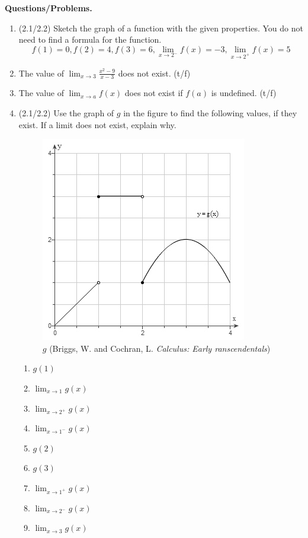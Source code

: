 \documentclass[11pt,letterpaper]{article}
\begin{document}
\vspace{1pc}
\item \textbf{Questions/Problems.} 

\begin{enumerate}
\item (2.1/2.2) Sketch the graph of a function with the given properties.  You do not need to find a formula for the function.
\[f(1)=0,f(2)=4,f(3)=6,\lim_{x\to 2^-}f(x)=-3,\lim_{x\to 2^+}f(x)=5\]

\item The value of $\lim_{x\to 3}\frac{x^2-9}{x-3}$ does not exist. (t/f)

\item The value of $\lim_{x\to a}f(x)$ does not exist if $f(a)$ is undefined. (t/f)

\item (2.1/2.2) Use the graph of $g$ in the figure to find the following values, if they exist.  If a limit does not exist, explain why.

\vspace{-1pc}  
\begin{figure}[h]
\begin{center}
\includegraphics[scale=0.6]{Exam1pic.png}
\caption{$g$ (Briggs, W. and Cochran, L. \emph{Calculus: Early ranscendentals})}
\end{center}
\end{figure}

\begin{enumerate}
\item $g(1)$
\item $\lim_{x\to 1}g(x)$
\item $\lim_{x\to 2^+}g(x)$
\item $\lim_{x\to 1^-}g(x)$
\item $g(2)$
\item $g(3)$
\item $\lim_{x\to 1^+}g(x)$
\item $\lim_{x\to 2^-}g(x)$
\item $\lim_{x\to 3}g(x)$
\end{enumerate}


\end{enumerate}
\end{document}
